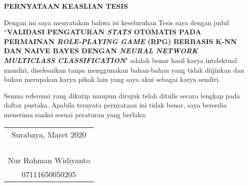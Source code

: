 \begin{center}
\Large\textbf{PERNYATAAN KEASLIAN TESIS}
\end{center}
\vspace{1ex}
\begin{spacing}{1.5}

\setlength{\parindent}{0.9cm} Dengan ini saya menyatakan bahwa isi keseluruhan Tesis saya dengan judul ``\textbf{VALIDASI PENGATURAN \textit{STATS} OTOMATIS PADA PERMAINAN \textit{ROLE-PLAYING GAME} (RPG) BERBASIS K-NN DAN NAIVE BAYES DENGAN \textit{NEURAL NETWORK MULTICLASS CLASSIFICATION}}" adalah benar hasil karya intelektual mandiri, diselesaikan tanpa menggunakan bahan-bahan yang tidak diijinkan dan bukan merupakan karya pihak lain yang saya akui sebagai karya sendiri.
\vspace{1ex}

Semua referensi yang dikutip maupun dirujuk telah ditulis secara lengkap pada daftar pustaka. Apabila ternyata pernyataan ini tidak benar, saya bersedia menerima sanksi sesuai peraturan yang berlaku.
\vspace{1ex}
\end{spacing}
\begin{flushright}
\begin{tabular}[b]{c}
  Surabaya, Maret 2020\\
  \\
  \\
  \\
  \\
  Nur Rohman Widiyanto\\
  07111650050205
\end{tabular}
\end{flushright}